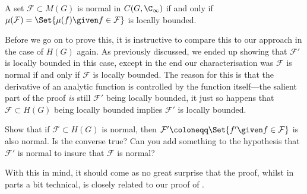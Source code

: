 \begin{theorem}\label{thm7.16}
	A set $\mathcal{F} \subset M(G)$ is normal in $C(G, \C_\infty)$ if and only if $\mu(\mathcal{F}) = \Set{\mu(f) \given f \in \mathcal{F}}$ is locally bounded.
\end{theorem}

Before we go on to prove this, it is instructive to compare this to our approach in the case of $H(G)$ again.
As previously discussed, we ended up showing that $\mathcal{F}'$ is locally bounded in this case, except in the end our characterisation was $\mathcal{F}$ is normal if and only if $\mathcal{F}$ is locally bounded.
The reason for this is that the derivative of an analytic function is controlled by the function itself---the salient part of the proof \emph{is} still $\mathcal{F}'$ being locally bounded, it just so happens that $\mathcal{F} \subset H(G)$ being locally bounded implies $\mathcal{F}'$ is locally bounded.

\begin{exercise}
	Show that if $\mathcal{F} \subset H(G)$ is normal, then $\mathcal{F}' \coloneqq \Set{f' \given f \in \mathcal{F}}$ is also normal.
	Is the converse true? Can you add something to the hypothesis that $\mathcal{F}'$ is normal to insure that $\mathcal{F}$ is normal?
\end{exercise}

With this in mind, it should come as no great surprise that the proof, whilst in parts a bit technical, is closely related to our proof of .

